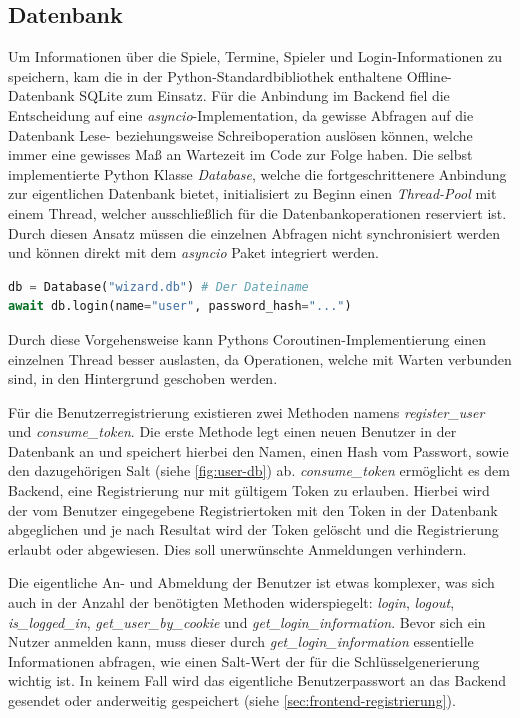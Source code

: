\subsection{Datenbank}
Um Informationen über die Spiele, Termine, Spieler und Login-Informationen zu speichern, kam die in der Python-Standardbibliothek enthaltene Offline-Datenbank SQLite zum Einsatz. Für die Anbindung im Backend fiel die Entscheidung auf eine \textit{asyncio}-Implementation, da gewisse Abfragen auf die Datenbank Lese- beziehungsweise Schreiboperation auslösen können, welche immer eine gewisses Maß an Wartezeit im Code zur Folge haben. Die selbst implementierte Python Klasse \textit{Database}, welche die fortgeschrittenere Anbindung zur eigentlichen Datenbank bietet, initialisiert zu Beginn einen \textit{Thread-Pool} mit einem Thread, welcher ausschließlich für die Datenbankoperationen reserviert ist. Durch diesen Ansatz müssen die einzelnen Abfragen nicht synchronisiert werden und können direkt mit dem \textit{asyncio} Paket integriert werden.

\begin{lstlisting}[language=Python]
db = Database("wizard.db") # Der Dateiname
await db.login(name="user", password_hash="...")
\end{lstlisting}

Durch diese Vorgehensweise kann Pythons Coroutinen-Implementierung einen einzelnen Thread besser auslasten, da Operationen, welche mit Warten verbunden sind, in den Hintergrund geschoben werden.

Für die Benutzerregistrierung existieren zwei Methoden namens \textit{register\_user} und \textit{consume\_token}. Die erste Methode legt einen neuen Benutzer in der Datenbank an und speichert hierbei den Namen, einen Hash vom Passwort, sowie den dazugehörigen Salt (siehe \cref{fig:user-db}) ab. \textit{consume\_token} ermöglicht es dem Backend, eine Registrierung nur mit gültigem Token zu erlauben. Hierbei wird der vom Benutzer eingegebene Registriertoken mit den Token in der Datenbank abgeglichen und je nach Resultat wird der Token gelöscht und die Registrierung erlaubt oder abgewiesen. Dies soll unerwünschte Anmeldungen verhindern.

Die eigentliche An- und Abmeldung der Benutzer ist etwas komplexer, was sich auch in der Anzahl der benötigten Methoden widerspiegelt: \textit{login}, \textit{logout}, \textit{is\_logged\_in}, \textit{get\_user\_by\_cookie} und \textit{get\_login\_information}. Bevor sich ein Nutzer anmelden kann, muss dieser durch \textit{get\_login\_information} essentielle Informationen abfragen, wie einen Salt-Wert der für die Schlüsselgenerierung wichtig ist. In keinem Fall wird das eigentliche Benutzerpasswort an das Backend gesendet oder anderweitig gespeichert (siehe \cref{sec:frontend-registrierung}).

